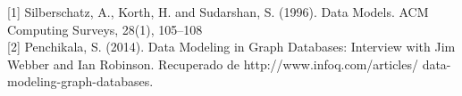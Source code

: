 \documentclass[preprint,12pt]{elsarticle}
\begin{document}
[1] Silberschatz, A., Korth, H. and Sudarshan, S. (1996).
Data Models. ACM Computing Surveys, 28(1),
105–108 \\

[2] Penchikala, S. (2014). Data Modeling in Graph Databases: Interview with Jim Webber and Ian Robinson. Recuperado de http://www.infoq.com/articles/
data-modeling-graph-databases.
	



	
\end{document}
